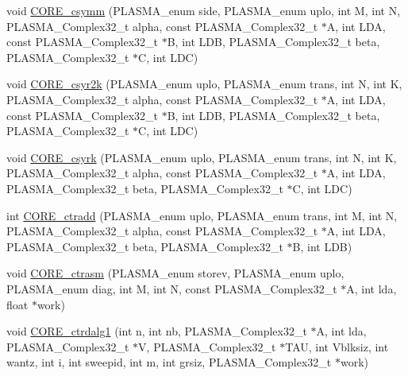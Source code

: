 \begin{DoxyCompactItemize}
\item 
void \hyperlink{group__CORE__PLASMA__Complex32__t_ga9ee60d99c109d72f762ee69bff8f9612_ga9ee60d99c109d72f762ee69bff8f9612}{C\+O\+R\+E\+\_\+csymm} (P\+L\+A\+S\+M\+A\+\_\+enum side, P\+L\+A\+S\+M\+A\+\_\+enum uplo, int M, int N, P\+L\+A\+S\+M\+A\+\_\+\+Complex32\+\_\+t alpha, const P\+L\+A\+S\+M\+A\+\_\+\+Complex32\+\_\+t $\ast$A, int L\+D\+A, const P\+L\+A\+S\+M\+A\+\_\+\+Complex32\+\_\+t $\ast$B, int L\+D\+B, P\+L\+A\+S\+M\+A\+\_\+\+Complex32\+\_\+t beta, P\+L\+A\+S\+M\+A\+\_\+\+Complex32\+\_\+t $\ast$C, int L\+D\+C)
\item 
void \hyperlink{group__CORE__PLASMA__Complex32__t_ga9e353ab4959d266c3d7dec7e8fe39f6b_ga9e353ab4959d266c3d7dec7e8fe39f6b}{C\+O\+R\+E\+\_\+csyr2k} (P\+L\+A\+S\+M\+A\+\_\+enum uplo, P\+L\+A\+S\+M\+A\+\_\+enum trans, int N, int K, P\+L\+A\+S\+M\+A\+\_\+\+Complex32\+\_\+t alpha, const P\+L\+A\+S\+M\+A\+\_\+\+Complex32\+\_\+t $\ast$A, int L\+D\+A, const P\+L\+A\+S\+M\+A\+\_\+\+Complex32\+\_\+t $\ast$B, int L\+D\+B, P\+L\+A\+S\+M\+A\+\_\+\+Complex32\+\_\+t beta, P\+L\+A\+S\+M\+A\+\_\+\+Complex32\+\_\+t $\ast$C, int L\+D\+C)
\item 
void \hyperlink{group__CORE__PLASMA__Complex32__t_gab533c4d2ce945cd525c45a1de9f54a10_gab533c4d2ce945cd525c45a1de9f54a10}{C\+O\+R\+E\+\_\+csyrk} (P\+L\+A\+S\+M\+A\+\_\+enum uplo, P\+L\+A\+S\+M\+A\+\_\+enum trans, int N, int K, P\+L\+A\+S\+M\+A\+\_\+\+Complex32\+\_\+t alpha, const P\+L\+A\+S\+M\+A\+\_\+\+Complex32\+\_\+t $\ast$A, int L\+D\+A, P\+L\+A\+S\+M\+A\+\_\+\+Complex32\+\_\+t beta, P\+L\+A\+S\+M\+A\+\_\+\+Complex32\+\_\+t $\ast$C, int L\+D\+C)
\item 
int \hyperlink{group__CORE__PLASMA__Complex32__t_ga59754c7bb4987c113f48539326740534_ga59754c7bb4987c113f48539326740534}{C\+O\+R\+E\+\_\+ctradd} (P\+L\+A\+S\+M\+A\+\_\+enum uplo, P\+L\+A\+S\+M\+A\+\_\+enum trans, int M, int N, P\+L\+A\+S\+M\+A\+\_\+\+Complex32\+\_\+t alpha, const P\+L\+A\+S\+M\+A\+\_\+\+Complex32\+\_\+t $\ast$A, int L\+D\+A, P\+L\+A\+S\+M\+A\+\_\+\+Complex32\+\_\+t beta, P\+L\+A\+S\+M\+A\+\_\+\+Complex32\+\_\+t $\ast$B, int L\+D\+B)
\item 
void \hyperlink{group__CORE__PLASMA__Complex32__t_gada4c6647fe7897a5592b3697784313ec_gada4c6647fe7897a5592b3697784313ec}{C\+O\+R\+E\+\_\+ctrasm} (P\+L\+A\+S\+M\+A\+\_\+enum storev, P\+L\+A\+S\+M\+A\+\_\+enum uplo, P\+L\+A\+S\+M\+A\+\_\+enum diag, int M, int N, const P\+L\+A\+S\+M\+A\+\_\+\+Complex32\+\_\+t $\ast$A, int lda, float $\ast$work)
\item 
void \hyperlink{group__CORE__PLASMA__Complex32__t_ga7f5683151b1259a07e742af5dfbb98c9_ga7f5683151b1259a07e742af5dfbb98c9}{C\+O\+R\+E\+\_\+ctrdalg1} (int n, int nb, P\+L\+A\+S\+M\+A\+\_\+\+Complex32\+\_\+t $\ast$A, int lda, P\+L\+A\+S\+M\+A\+\_\+\+Complex32\+\_\+t $\ast$V, P\+L\+A\+S\+M\+A\+\_\+\+Complex32\+\_\+t $\ast$T\+A\+U, int Vblksiz, int wantz, int i, int sweepid, int m, int grsiz, P\+L\+A\+S\+M\+A\+\_\+\+Complex32\+\_\+t $\ast$work)

\end{DoxyCompactItemize}

